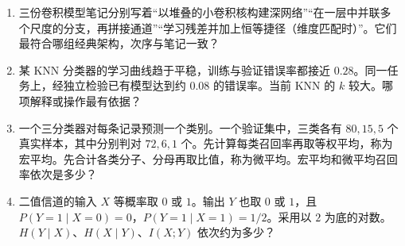\begin{enumerate}[label=\arabic*.]
\item \judge 三份卷积模型笔记分别写着“以堆叠的小卷积核构建深网络”“在一层中并联多个尺度的分支，再拼接通道”“学习残差并加上恒等捷径（维度匹配时）”。它们最符合哪组经典架构，次序与笔记一致？

\item \judge 某 KNN 分类器的学习曲线趋于平稳，训练与验证错误率都接近 $0.28$。同一任务上，经独立检验已有模型达到约 $0.08$ 的错误率。当前 KNN 的 $k$ 较大。哪项解释或操作最有依据？

\item \judge 一个三分类器对每条记录预测一个类别。一个验证集中，三类各有 $80,15,5$ 个真实样本，其中分别判对 $72,6,1$ 个。先计算每类召回率再取等权平均，称为宏平均。先合计各类分子、分母再取比值，称为微平均。宏平均和微平均召回率依次是多少？

\item \judge 二值信道的输入 $X$ 等概率取 $0$ 或 $1$。输出 $Y$ 也取 $0$ 或 $1$，且 $P(Y=1\mid X=0)=0$，$P(Y=1\mid X=1)=1/2$。采用以 $2$ 为底的对数。$H(Y\mid X)$、$H(X\mid Y)$、$I(X;Y)$ 依次约为多少？
\end{enumerate}

